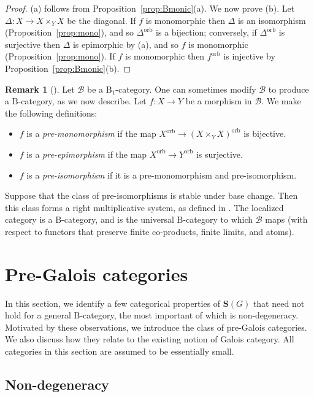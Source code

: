 \documentclass[12pt]{amsart}
\numberwithin{equation}{section}
\theoremstyle{definition}
\newtheorem{rmk}[equation]{Remark}
\newenvironment{remark}[1][]{\begin{rmk}[#1] \pushQED{\qed}}{\popQED \end{rmk}}
\newcommand{\cB}{\mathcal{B}}
\newcommand{\rB}{\mathrm{B}}
\newcommand{\bS}{\mathbf{S}}
\newcommand{\stacks}[1]{\cite[\href{http://stacks.math.columbia.edu/tag/#1}{Tag~#1}]{stacks}}
\newcommand{\defn}[1]{\emph{#1}}
\newcommand{\orb}{\mathrm{orb}}
\begin{document}
\begin{proof}
(a) follows from Proposition~\ref{prop:Bmonic}(a). We now prove (b). Let $\Delta \colon X \to X \times_Y X$ be the diagonal. If $f$ is monomorphic then $\Delta$ is an isomorphism (Proposition~\ref{prop:mono}), and so $\Delta^{\orb}$ is a bijection; conversely, if $\Delta^{\orb}$ is surjective then $\Delta$ is epimorphic by (a), and so $f$ is monomorphic (Proposition~\ref{prop:mono}). If $f$ is monomorphic then $f^{\orb}$ is injective by Proposition~\ref{prop:Bmonic}(b).
\end{proof}

\begin{remark}
Let $\cB$ be a $\rB_1$-category. One can sometimes modify $\cB$ to produce a $\rB$-category, as we now describe. Let $f \colon X \to Y$ be a morphism in $\cB$. We make the following definitions:
\begin{itemize}
\item $f$ is a \defn{pre-monomorphism} if the map $X^{\orb} \to (X \times_Y X)^{\orb}$ is bijective.
\item $f$ is a \defn{pre-epimorphism} if the map $X^{\orb} \to Y^{\orb}$ is surjective.
\item $f$ is a \defn{pre-isomorphism} if it is a pre-monomorphism and pre-isomorphism.
\end{itemize}
Suppose that the class of pre-isomorphisms is stable under base change. Then this class forms a right multiplicative system, as defined in \stacks{04VC}. The localized category is a $\rB$-category, and is the universal $\rB$-category to which $\cB$ maps (with respect to functors that preserve finite co-products, finite limits, and atoms).
\end{remark}

\section{Pre-Galois categories} \label{s:pre-galois}

In this section, we identify a few categorical properties of $\bS(G)$ that need not hold for a general $\rB$-category, the most important of which is non-degeneracy. Motivated by these observations, we introduce the class of pre-Galois categories. We also discuss how they relate to the existing notion of Galois category. All categories in this section are assumed to be essentially small.

\subsection{Non-degeneracy}
\end{document}

